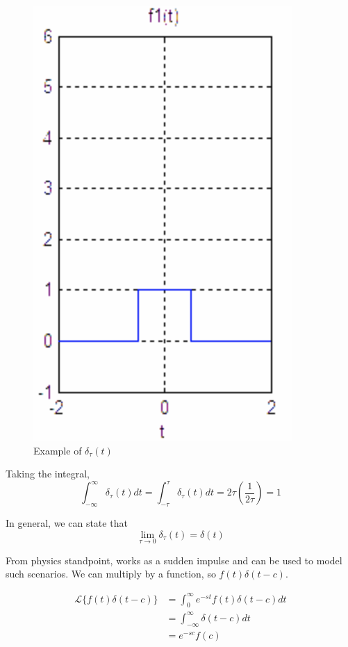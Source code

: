 \begin{figure}[H]
    \centering
    \includegraphics[scale=0.5]{figures/dirac-example.png}
    \caption{Example of $\delta_\tau(t)$}
\end{figure}

Taking the integral,
\begin{equation*}
    \int_{-\infty}^\infty \delta_\tau(t)dt=\int_{-\tau}^\tau \delta_\tau(t)dt=2\tau\left(\frac{1}{2\tau}\right)=1
\end{equation*}

In general, we can state that
\begin{equation*}
    \lim_{\tau\to 0}\delta_\tau(t)=\delta(t)
\end{equation*}

From physics standpoint, works as a sudden impulse and can be used to model such scenarios.
We can multiply by a function, so $f(t)\delta(t-c)$.

\begin{align*}
    \mathcal{L}\{f(t)\delta(t-c)\}&=\int_0^\infty e^{-st}f(t)\delta(t-c)dt\\
    &=\int_{-\infty}^{\infty} \delta(t-c)dt\\
    &=e^{-sc}f(c)
\end{align*}
